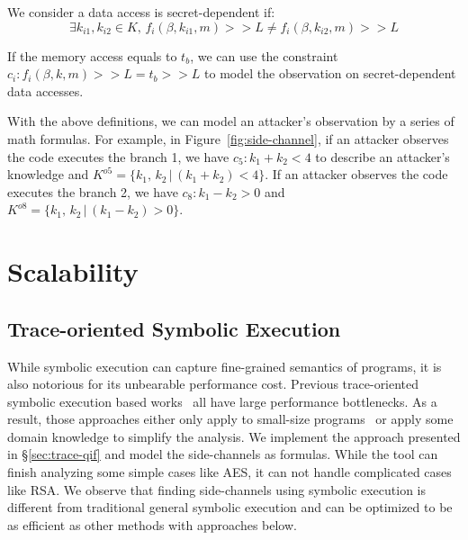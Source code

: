 We consider a data access is secret-dependent if:
$$\exists k_{i1}, k_{i2} \in K, \,f_i(\beta, k_{i1}, m) >> L \neq f_i(\beta, k_{i2}, m) >> L$$

If the memory access equals to $t_b$, we can use the constraint $c_i :
f_i(\beta, k, m) >> L = t_b >> L$ to model the observation on secret-dependent
data accesses.

With the above definitions, we can model an attacker's observation by a series of math
formulas. For example, in Figure~\ref{fig:side-channel}, if an attacker observes
the code executes the branch 1, we have $c_5: k_1 + k_2 < 4$ to describe an
attacker's knowledge and $K^{o5} = \{k_1,\, k_2\,|\, (k_1 + k_2) < 4\}$. If an
attacker observes the code executes the branch 2, we have $c_8: k_1 - k_2 > 0$
and $K^{o8} = \{k_1,\, k_2\,|\, (k_1 - k_2) > 0\}$.
\section{Scalability}
\subsection{Trace-oriented Symbolic Execution}
While symbolic execution can capture fine-grained semantics of programs, it
is also notorious for its unbearable performance cost. Previous trace-oriented
symbolic execution based
works~\cite{203878,Chattopadhyay:2017:QIL:3127041.3127044} all have large
performance bottlenecks. As a result, those approaches either only apply to
small-size programs~\cite{Chattopadhyay:2017:QIL:3127041.3127044} or apply some
domain knowledge to simplify the analysis. 
We implement
the approach presented in \S\ref{sec:trace-qif} and model the side-channels as
formulas. While the tool can finish analyzing some simple cases like AES, it can
not handle complicated cases like RSA.
We observe that finding side-channels using symbolic execution is different from
traditional general symbolic execution and can be optimized to be as efficient
as other methods with approaches below.

